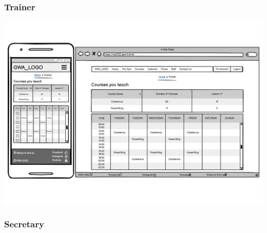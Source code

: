 \subsubsection{Trainer}
\includegraphics[width=\columnwidth]{InterfaceMockup/Trainer/Trainer.pdf}

\subsubsection{Secretary}

